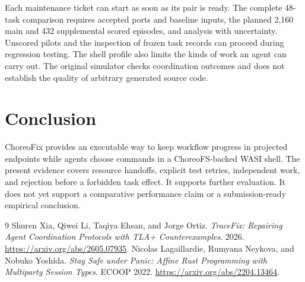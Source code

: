 \documentclass[10pt]{article}
\begin{document}
Each maintenance ticket can start as soon as its pair is ready. The complete
48-task comparison requires accepted ports and baseline inputs, the planned
2,160 main and 432 supplemental scored episodes, and analysis with uncertainty.
Unscored pilots and the inspection of frozen task records can proceed during
regression testing. The shell profile also limits the kinds of work an
agent can carry out. The original simulator checks coordination outcomes and
does not establish the quality of arbitrary generated source code.

\section{Conclusion}
ChoreoFix provides an executable way to keep workflow progress in projected
endpoints while agents choose commands in a ChoreoFS-backed WASI shell.
The present evidence covers resource handoffs, explicit test retries,
independent work, and rejection before a forbidden task effect. It supports
further evaluation. It does not yet support a comparative performance claim or
a submission-ready empirical conclusion.

\begin{thebibliography}{9}
 Shuren Xia, Qiwei Li, Taqiya Ehsan, and Jorge Ortiz.
\emph{TraceFix: Repairing Agent Coordination Protocols with TLA+ Counterexamples}.
2026. \url{https://arxiv.org/abs/2605.07935}.
 Nicolas Lagaillardie, Rumyana Neykova, and Nobuko Yoshida.
\emph{Stay Safe under Panic: Affine Rust Programming with Multiparty Session Types}.
ECOOP 2022. \url{https://arxiv.org/abs/2204.13464}.
\end{thebibliography}
\end{document}
